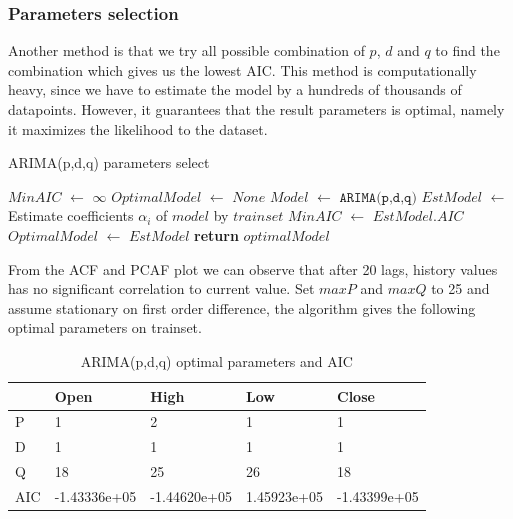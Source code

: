 \documentclass[11pt]{article}
\begin{document}
\subsubsection{Parameters selection}
Another method is that we try all possible combination of $p$, $d$ and $q$ to
find the combination which gives us the lowest AIC. This method is
computationally heavy, since we have to estimate the model by a hundreds of
thousands of datapoints. However, it guarantees that the result parameters is
optimal, namely it maximizes the likelihood to the dataset.
\begin{algorithm}[H]
\caption{ARIMA(p,d,q) parameters select}\label{paramsselect1}
\begin{algorithmic}[1]
  \State $MinAIC$ $\gets$ $\infty$
  \State $OptimalModel$ $\gets$ $None$
  \State $Model$ $\gets$ $\texttt{ARIMA(p,d,q)}$
  \State $EstModel$ $\gets$ Estimate coefficients $\alpha_i$ of $model$ by $trainset$
  \State $MinAIC$ $\gets$ $EstModel.AIC$
  \State $OptimalModel$ $\gets$ $EstModel$
  \EndIf
  \EndFor
  \EndFor
  \EndFor
  \State \textbf{return} $optimalModel$
\EndProcedure
\end{algorithmic}
\end{algorithm}
From the ACF and PCAF plot we can observe that after 20 lags, history values has
no significant correlation to current value. Set $maxP$ and $maxQ$ to 25 and
assume stationary on first order difference, the algorithm gives the following
optimal parameters on trainset.
\begin{table}[H]
  \centering 
\begin{tabular}{|l|l|l|l|l|}
  \hline
                   & Open        & High       & Low        & Close      \\ \hline
  P                & 1           & 2          & 1          & 1          \\ \hline
  D                & 1           & 1          & 1          & 1          \\ \hline
  Q                & 18          & 25         & 26         & 18         \\ \hline
  AIC              & -1.43336e+05   & -1.44620e+05  & 1.45923e+05 & -1.43399e+05    \\ \hline
\end{tabular}
\caption{ARIMA(p,d,q) optimal parameters and AIC}
\end{table}
\end{document}

